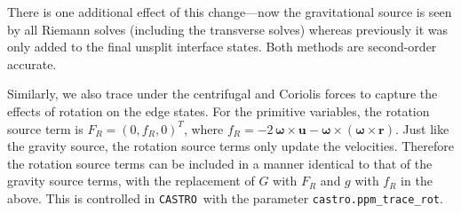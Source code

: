 \documentclass[iop]{../emulateapj}
\newcommand{\castro}{\texttt{CASTRO}}
\begin{document}
There is one additional effect of this change---now the gravitational
source is seen by all Riemann solves (including the transverse solves)
whereas previously it was only added to the final unsplit interface
states.  Both methods are second-order accurate.

Similarly, we also trace under the centrifugal and Coriolis forces to capture
the effects of rotation on the edge states. For the primitive variables, the rotation
source term is $F_R = (0, f_R, 0)^T$, where $f_R = -2\, {\bm{\omega}} \times \mathbf{u} - {\bm\omega}\times \left({\bm\omega} \times \mathbf{r}\right).$
Just like the gravity source, the rotation source terms only update the velocities. Therefore 
the rotation source terms can be included in a manner identical to that of the gravity source
terms, with the replacement of $G$ with $F_R$ and $g$ with $f_R$ in the above. This is controlled in \castro\
with the parameter {\tt castro.ppm\_trace\_rot}.



\clearpage




\clearpage
\end{document}
